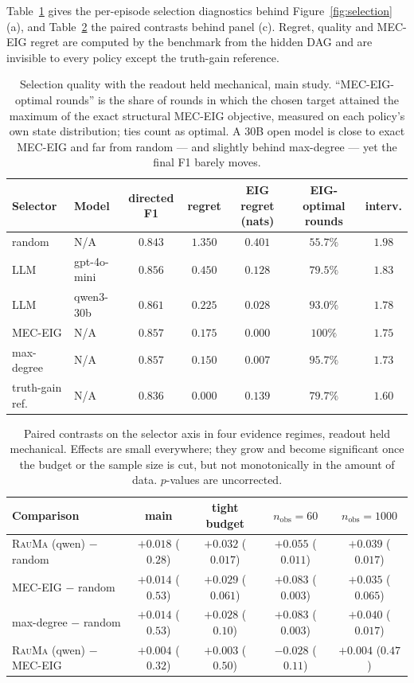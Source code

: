 \documentclass{article}
\newcommand{\rauma}{\textsc{RauMa}}
\begin{document}
Table~\ref{tab:sel} gives the per-episode selection diagnostics behind
Figure~\ref{fig:selection}(a), and Table~\ref{tab:selreg} the paired contrasts behind panel
(c). Regret, quality and MEC-EIG regret are computed by the benchmark from the hidden DAG and
are invisible to every policy except the truth-gain reference.

\begin{table}[h]
\caption{Selection quality with the readout held mechanical, main study. ``MEC-EIG-optimal
rounds'' is the share of rounds in which the chosen target attained the maximum of the exact
structural MEC-EIG objective, measured on each policy's own state distribution; ties count as
optimal. A 30B open model is close to exact MEC-EIG and far from random --- and slightly
behind max-degree --- yet the final F1 barely moves.}
\label{tab:sel}
\centering
\small
\begin{tabular}{llccccc}
\toprule
Selector & Model & directed F1 & regret & EIG regret (nats) & EIG-optimal rounds & interv. \\
\midrule
random & N/A & $0.843$ & $1.350$ & $0.401$ & $55.7\%$ & $1.98$ \\
LLM & gpt-4o-mini & $0.856$ & $0.450$ & $0.128$ & $79.5\%$ & $1.83$ \\
LLM & qwen3-30b & $\mathbf{0.861}$ & $0.225$ & $0.028$ & $93.0\%$ & $1.78$ \\
MEC-EIG & N/A & $0.857$ & $0.175$ & $0.000$ & $100\%$ & $1.75$ \\
max-degree & N/A & $0.857$ & $0.150$ & $0.007$ & $\mathbf{95.7\%}$ & $1.73$ \\
truth-gain ref. & N/A & $0.836$ & $0.000$ & $0.139$ & $79.7\%$ & $1.60$ \\
\bottomrule
\end{tabular}
\end{table}

\begin{table}[h]
\caption{Paired contrasts on the selector axis in four evidence regimes, readout held
mechanical. Effects are small everywhere; they grow and become significant once the budget or
the sample size is cut, but not monotonically in the amount of data. $p$-values are
uncorrected.}
\label{tab:selreg}
\centering
\small
\begin{tabular}{lcccc}
\toprule
Comparison & main & tight budget & $n_{\mathrm{obs}}{=}60$ & $n_{\mathrm{obs}}{=}1000$ \\
\midrule
\rauma{} (qwen) $-$ random & $+0.018$ ($0.28$) & $+0.032$ ($0.017$) & $+0.055$ ($0.011$) & $+0.039$ ($0.017$) \\
MEC-EIG $-$ random & $+0.014$ ($0.53$) & $+0.029$ ($0.061$) & $+0.083$ ($0.003$) & $+0.035$ ($0.065$) \\
max-degree $-$ random & $+0.014$ ($0.53$) & $+0.028$ ($0.10$) & $+0.083$ ($0.003$) & $+0.040$ ($0.017$) \\
\rauma{} (qwen) $-$ MEC-EIG & $+0.004$ ($0.32$) & $+0.003$ ($0.50$) & $-0.028$ ($0.11$) & $+0.004$ ($0.47$) \\
\bottomrule
\end{tabular}
\end{table}
\end{document}
